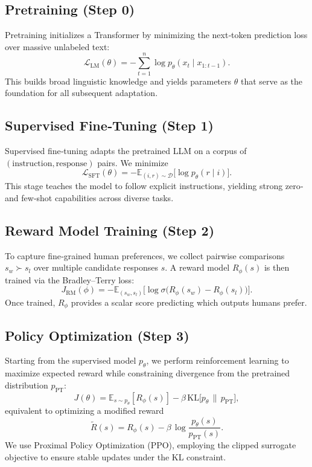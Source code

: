 \documentclass{article}
\begin{document}
\subsection{Pretraining (Step 0)}

Pretraining initializes a Transformer by minimizing the next‑token prediction loss over massive unlabeled text:
\[
  \mathcal{L}_{\mathrm{LM}}(\theta) = -\sum_{t=1}^n \log p_\theta(x_t \mid x_{1:t-1}).
\]
This builds broad linguistic knowledge and yields parameters \(\theta\) that serve as the foundation for all subsequent adaptation.

\subsection{Supervised Fine‑Tuning (Step 1)}

Supervised fine‑tuning adapts the pretrained LLM on a corpus of \((\text{instruction},\text{response})\) pairs.  We minimize
\[
  \mathcal{L}_{\mathrm{SFT}}(\theta) = -\mathbb{E}_{(i,r)\sim\mathcal{D}}\bigl[\log p_\theta(r\mid i)\bigr].
\]
This stage teaches the model to follow explicit instructions, yielding strong zero‑ and few‑shot capabilities across diverse tasks.

\subsection{Reward Model Training (Step 2)}

To capture fine‑grained human preferences, we collect pairwise comparisons \(s_w \succ s_l\) over multiple candidate responses \(s\). A reward model \(R_\phi(s)\) is then trained via the Bradley–Terry loss:
\[
  J_{\mathrm{RM}}(\phi) = -\mathbb{E}_{(s_w,s_l)}\bigl[\log \sigma\bigl(R_\phi(s_w)-R_\phi(s_l)\bigr)\bigr].
\]
Once trained, \(R_\phi\) provides a scalar score predicting which outputs humans prefer.

\subsection{Policy Optimization (Step 3)}

Starting from the supervised model \(p_\theta\), we perform reinforcement learning to maximize expected reward while constraining divergence from the pretrained distribution \(p_{\mathrm{PT}}\):
\[
  J(\theta) = \mathbb{E}_{s\sim p_\theta}[R_\phi(s)] - \beta\,\mathrm{KL}\bigl[p_\theta \,\|\, p_{\mathrm{PT}}\bigr],
\]
equivalent to optimizing a modified reward
\[
  \widetilde R(s) = R_\phi(s) - \beta\,\log\frac{p_\theta(s)}{p_{\mathrm{PT}}(s)}.
\]
We use Proximal Policy Optimization (PPO), employing the clipped surrogate objective to ensure stable updates under the KL constraint.
\end{document}

